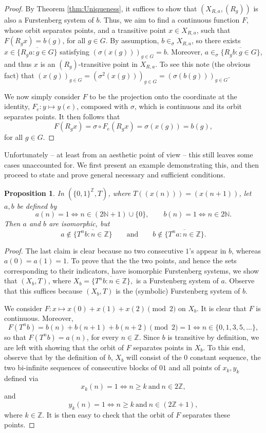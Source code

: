 \documentclass{amsart}
\numberwithin{equation}{section}
\newtheorem{proposition}[lemma]{Proposition}
\theoremstyle{definition}
\theoremstyle{plain}
\newcommand{\Z}{{\mathbb Z}}
\begin{document}
\begin{proof} By Theorem \ref{thm:Uniqueness}, it suffices to show that $(X_{R,a}, (R_g))$ is also a Furstenberg system of $b$. Thus, we aim to find a continuous function $F$, whose orbit separates points, and a transitive point $x\in X_{R,a}$, such that $F(R_gx)=b(g)$, for all $g\in G$. By assumption, $b\in_{\sigma} X_{R,a}$, so there exists $x\in \overline{\{R_ga:g\in G\}}$ satisfying $(\sigma(x(g)))_{g\in G}=b$. Moreover, $a\in_{\sigma} \overline{\{R_gb:g\in G\}}$, and thus $x$ is an $(R_g)$-transitive point in $X_{R,a}$. To see this note (the obvious fact) that $(x(g))_{g\in G}=(\sigma^2(x(g)))_{g\in G}=(\sigma(b(g)))_{g\in G}$.

We now simply consider $F$ to be the projection onto the 
coordinate at the identity, $F_e:y\mapsto y(e)$, 
composed with $\sigma$, which is continuous and its orbit separates points. It then
follows that 
$$F(R_gx)=\sigma\circ F_e(R_gx)=\sigma(x(g))=b(g),$$ for all $g\in G$.
\end{proof}

Unfortunately -- at least from an aesthetic point of view -- this still leaves some cases unaccounted for. 
We first present an example demonstrating this, and then 
proceed to state and prove general necessary and 
sufficient conditions.

\begin{proposition}\label{example of isomorphic points}
In $(\{0,1\}^{\mathbb{Z}}, T)$, where $T((x(n))) = (x(n+1))$, let $a,b$ be defined by
\[
a(n) = 1 \iff n \in (2\mathbb{N} + 1) \cup \{0\}, 
\qquad
b(n) = 1 \iff n \in 2\mathbb{N}.
\]
Then $a$ and $b$ are isomorphic, but 
\[
a \notin \overline{\{T^n b : n \in \mathbb{Z}\}}
\qquad \text{and} \qquad 
b \notin \overline{\{T^n a : n \in \mathbb{Z}\}}.
\]
\end{proposition}

\begin{proof}
The last claim is clear because no two consecutive $1$'s appear in $b$, whereas $a(0)=a(1)=1$. To prove that the 
the two points, and hence the sets corresponding to 
their indicators, have isomorphic Furstenberg systems, we 
show that $(X_b,T)$, 
where $X_b=\overline{\{T^nb:n\in \Z\}},$ is a Furstenberg 
system of $a$. Observe that this suffices because $(X_b,T)$ is the (symbolic) Furstenberg system of $b$.

We consider $F:x\mapsto x(0)+x(1)+x(2) \pmod{2}$ on $X_b$. It is 
clear that $F$ is continuous. Moreover, 
$$F(T^nb)=b(n)+b(n+1)+b(n+2) \pmod{2} = 1 \iff n\in \{0,1,3,5,\ldots\},$$
so that $F(T^nb)=a(n)$, for every $n\in \Z$. Since $b$ is transitive 
by definition, we are left with showing that the orbit of $F$ 
separates points in $X_b$. To this end, observe that by 
the definition of $b$, $X_b$ will 
consist of the $0$ 
constant sequence, the two bi-infinite sequences of 
consecutive 
blocks of $01$ and all points of $x_k,y_k$ defined via 
$$x_k(n)=1 \iff n\geq k\ \text{and}\ n\in 2\Z,$$ and
$$y_k(n)=1 \iff n\geq k\ \text{and}\ n\in (2\Z+1),$$
where $k\in \Z$. It is then easy to check that the orbit 
of $F$ separates these points.  
\end{proof}
\end{document}
